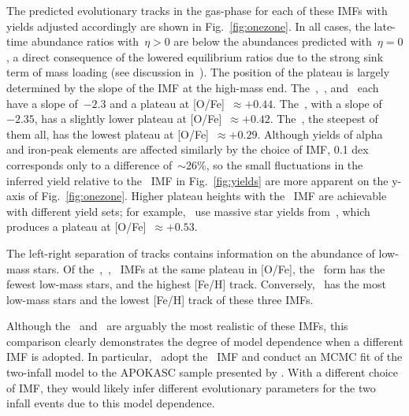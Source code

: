 \documentclass[12pt]{article}
\begin{document}
The predicted evolutionary tracks in the gas-phase for each of these IMFs with
yields adjusted accordingly are shown in Fig.~\ref{fig:onezone}.
In all cases, the late-time abundance ratios with~$\eta > 0$ are below the
abundances predicted with~$\eta = 0$, a direct consequence of the lowered
equilibrium ratios due to the strong sink term of mass loading (see discussion
in~\citealt{Weinberg2017}).
The position of the plateau is largely determined by the slope of the IMF at
the high-mass end.
The~\citet{Kroupa2001},~\citet{Miller1979}, and~\citet{Chabrier2003} each have
a slope of~$-2.3$ and a plateau at [O/Fe]~$\approx +0.44$.
The~\citet{Salpeter1955}, with a slope of~$-2.35$, has a slightly lower plateau
at [O/Fe]~$\approx +0.42$.
The~\citet{Scalo1986}, the steepest of them all, has the lowest plateau at
[O/Fe]~$\approx +0.29$.
Although yields of alpha and iron-peak elements are affected similarly by the
choice of IMF, 0.1 dex corresponds only to a difference of~$\sim$26\%, so the
small fluctuations in the inferred yield relative to the~\citet{Kroupa2001} IMF
in Fig.~\ref{fig:yields} are more apparent on the y-axis of
Fig.~\ref{fig:onezone}.
Higher plateau heights with the~\citet{Scalo1986} IMF are achievable with
different yield sets; for example,~\citet{Spitoni2019} use massive star yields
from~\citet{Woosley1995}, which produces a plateau at [O/Fe]~$\approx +0.53$.
\par
The left-right separation of tracks contains information on the abundance of
low-mass stars.
Of the~\citet{Kroupa2001},~\citet{Miller1979},~\citet{Chabrier2003} IMFs at the
same plateau in [O/Fe], the~\citet{Miller1979} form has the fewest low-mass
stars, and the highest [Fe/H] track.
Conversely,~\citet{Kroupa2001} has the most low-mass stars and the lowest
[Fe/H] track of these three IMFs.
\par
Although the~\citet{Kroupa2001} and~\citet{Chabrier2003} are arguably the most
realistic of these IMFs, this comparison clearly demonstrates the degree of
model dependence when a different IMF is adopted.
In particular,~\citet{Spitoni2020} adopt the~\citet{Scalo1986} IMF and conduct
an MCMC fit of the two-infall model to the APOKASC sample presented by
\citet{SilvaAguirre2018}.
With a different choice of IMF, they would likely infer different evolutionary
parameters for the two infall events due to this model dependence.



\end{document}
